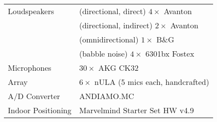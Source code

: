 \begin{tabular}{ll}
    \toprule
        Loudspeakers   & (directional, direct) $4 \times$ Avanton\\
                    & (directional, indirect) $2 \times$ Avanton\\
                    & (omnidirectional) $1 \times$ B\&G\\
                    & (babble noise) $4 \times$ 6301bx Fostex\\
        \hline
        Microphones    & $30 \times$ AKG CK32\\
        Array          & $6 \times$ nULA (5 mics each, handcrafted)\\
        \hline
        A/D Converter  & ANDIAMO.MC\\
        \hline
        Indoor Positioning & Marvelmind Starter Set HW v4.9\\
        \bottomrule
\end{tabular}